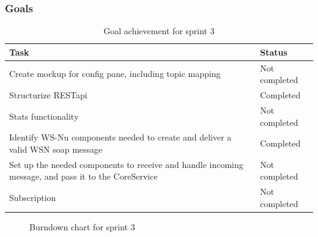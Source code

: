 \subsubsection{Goals}
\label{subsec:project_lifecycle-development-sprint_3-goals}

\begin{table}[ht!]
\small
\centering
\begin{tabular}{ | p{10cm} | p{2cm} |}
\hline
\rowcolor{lightgray}
 \textbf{Task} & \textbf{Status} \\
\hline
\rowcolor{orange!40}
Create mockup for config pane, including topic mapping & Not completed \\
\rowcolor{green!30}
Structurize RESTapi & Completed \\
\rowcolor{orange!40}
Stats functionality & Not completed \\
\rowcolor{green!30}
Identify WS-Nu components needed to create and deliver a valid WSN soap message & Completed \\
\rowcolor{orange!40}
Set up the needed components to receive and handle incoming message, and pass it to the CoreService & Not completed \\
\rowcolor{orange!40}
Subscription & Not completed \\
\hline
\end{tabular}
\caption{Goal achievement for sprint 3}
\label{tab:sprint 3, goals}
\end{table}

\begin{center}
  \begin{figure}[ht!]
    \caption{Burndown chart for sprint 3}
    \label{fig:sprint 3, burndown}
  \end{figure}
\end{center}

